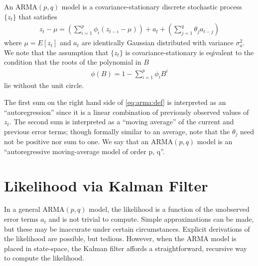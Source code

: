 \label{lab:arma}

An $\text{ARMA}(p,q)$ model is a covariance-stationary discrete stochastic
process $\{z_t\}$ that satisfies
\begin{align}
    \label{eq:arma:def}
    z_t - \mu = \left(\sum_{i=1}^p \phi_{i}(z_{t - i} - \mu)\right) + a_t +
    \left(\sum_{j=1}^{q} \theta_{j}a_{t-j} \right)
\end{align}
where $\mu = E[z_t]$ and $a_t$ are identically Gaussian distributed with
variance $\sigma_a^2$. We note that the assumption that $\{z_t\}$ is
covariance-stationary is eqivalent to the condition that the roots of the
polynomial in $B$ 
\begin{align}
    \label{eq:arma:characteristic}
    \phi(B) = 1 - \sum_{i=1}^p\phi_iB^i 
\end{align} 
lie without the unit circle.

The first sum on the right hand side of \ref{eq:arma:def} is interpreted as an
``autoregression'' since it is a linear combination of previously observed
values of $z_t$. The second sum is interpreted as a ``moving average'' of the
current and previous error terms; though formally similar to an average, note
that the $\theta_j$ need not be positive nor sum to one. We say that an
$\text{ARMA}(p,q)$ model is an ``autoregressive moving-average model of order
p, q''.

\section*{Likelihood via Kalman Filter}

In a general $\text{ARMA}(p,q)$ model, the likelihood is a function of the
unobserved error terms $a_t$ and is not trivial to compute. Simple
approximations can be made, but these may be inaccurate under certain
circumstances. Explicit derivations of the likelihood are possible, but
tedious. However, when the $\text{ARMA}$ model is placed in state-space, the
Kalman filter affords a straightforward, recursive way to compute the
likelihood.

